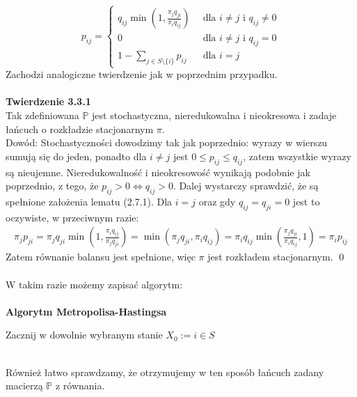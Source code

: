 \documentclass[a4paper]{article}
\begin{document}
$$
    p_{ij} = \begin{cases} q_{ij} \min(1, \frac{\pi_j q_{ji}}{\pi_i q_{ij}}) \,\,\,&\text{dla $i \neq j$ i $q_{ij} \neq 0$}\\
                    0 \,\,\, &\text{dla $i \neq j$ i $q_{ij} = 0$}\\
                    1 - \sum\limits_{j \in S \setminus \{i\}} p_{ij}\,\,\, &\text{dla $i = j$}
            \end{cases}
$$
Zachodzi analogiczne twierdzenie jak w poprzednim przypadku.
\\\\
\textbf{Twierdzenie 3.3.1}\\
Tak zdefiniowana $\mathbb{P}$ jest stochastyczna, nieredukowalna i nieokresowa i zadaje łańcuch o rozkładzie stacjonarnym $\pi$.\\
Dowód: Stochastyczności dowodzimy tak jak poprzednio: wyrazy w wierszu sumują się do jeden, ponadto dla $i \neq j$ jest $0 \leq p_{ij} \leq q_{ij}$, zatem wszystkie wyrazy są nieujemne. Nieredukowalność i nieokresowość wynikają podobnie jak poprzednio, z tego, że $p_{ij} > 0 \iff q_{ij} > 0$. Dalej wystarczy sprawdzić, że są spełnione założenia lematu (2.7.1). Dla $i=j$ oraz gdy $q_{ij} = q_{ji} =  0$ jest to oczywiste, w przeciwnym razie:
\begin{align*}
    \pi_j p_{ji} = \pi_j q_{ji} \min(1, \frac{\pi_i q_{ij}}{\pi_j q_{ji}}) =  \min(\pi_j q_{ji}, \pi_i q_{ij}) = \pi_i q_{ij} \min(\frac{\pi_j q_{ji}}{\pi_i q_{ij}}, 1) = \pi_i p_{ij}
\end{align*}
Zatem równanie balansu jest spełnione, więc $\pi$ jest rozkładem stacjonarnym. \qed
\\\\
W takim razie możemy zapisać algorytm:\\\\
\textbf{Algorytm Metropolisa-Hastingsa}
\begin{algorithm}
Zacznij w dowolnie wybranym stanie $X_0 := i \in S$\;
\end{algorithm}
\\
Również łatwo sprawdzamy, że otrzymujemy w ten sposób łańcuch zadany macierzą $\mathbb{P}$ z równania.\\
\end{document}
